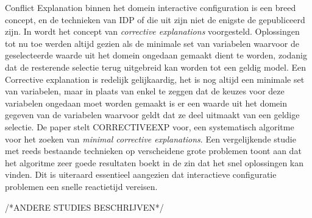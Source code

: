 Conflict Explanation binnen het domein interactive configuration is een breed concept, en de technieken van IDP of die uit \citep{amilhastre2002consistency} zijn niet de enigste de gepubliceerd zijn. In \cite{o2005generating} wordt het concept van \textit{corrective explanations} voorgesteld. Oplossingen tot nu toe werden altijd gezien als de minimale set van variabelen waarvoor de geselecteerde waarde uit het domein ongedaan gemaakt dient te worden, zodanig dat de resterende selectie terug uitgebreid kan worden tot een geldig model. Een Corrective explanation is redelijk gelijkaardig, het is nog altijd een minimale set van variabelen, maar in plaats van enkel te zeggen dat de keuzes voor deze variabelen ongedaan moet worden gemaakt is er een waarde uit het domein gegeven van de variabelen waarvoor geldt dat ze deel uitmaakt van een geldige selectie. De paper stelt CORRECTIVEEXP voor, een systematisch algoritme voor het zoeken van \emph{minimal corrective explanations}. Een vergelijkende studie met reeds bestaande technieken op verscheidene grote problemen toont aan dat het algoritme zeer goede resultaten boekt in de zin dat het snel oplossingen kan vinden. Dit is uiteraard essentieel aangezien dat interactieve configuratie problemen een snelle reactietijd vereisen.

/*ANDERE STUDIES BESCHRIJVEN*/
